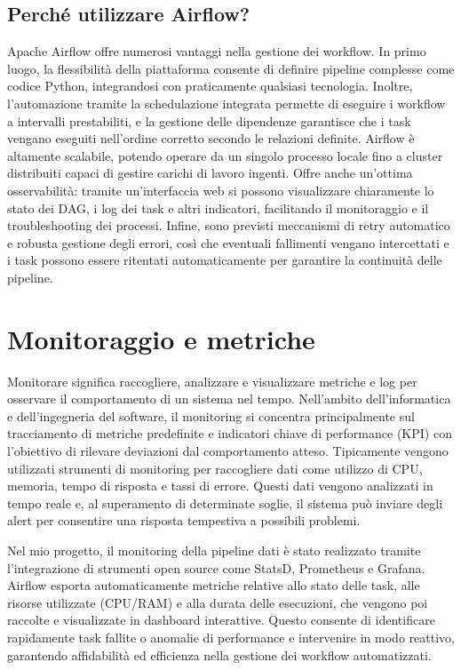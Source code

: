 \subsection{Perché utilizzare Airflow?}
\label{sec:percheairflow}
Apache Airflow offre numerosi vantaggi nella gestione dei workflow. In primo luogo, la flessibilità della piattaforma consente di definire pipeline complesse come codice Python, integrandosi con praticamente qualsiasi tecnologia. Inoltre, l’automazione tramite la schedulazione integrata permette di eseguire i workflow a intervalli prestabiliti, e la gestione delle dipendenze garantisce che i task vengano eseguiti nell’ordine corretto secondo le relazioni definite. Airflow è altamente scalabile, potendo operare da un singolo processo locale fino a cluster distribuiti capaci di gestire carichi di lavoro ingenti. Offre anche un’ottima osservabilità: tramite un’interfaccia web si possono visualizzare chiaramente lo stato dei DAG, i log dei task e altri indicatori, facilitando il monitoraggio e il troubleshooting dei processi. Infine, sono previsti meccanismi di retry automatico e robusta gestione degli errori, così che eventuali fallimenti vengano intercettati e i task possono essere ritentati automaticamente per garantire la continuità delle pipeline.

\section{Monitoraggio e metriche}
\label{sec:monitoraggioemetriche}

Monitorare significa raccogliere, analizzare e visualizzare metriche e log per osservare il comportamento di un sistema nel tempo. Nell’ambito dell’informatica e dell’ingegneria del software, il monitoring si concentra principalmente sul tracciamento di metriche predefinite e indicatori chiave di performance (KPI) con l’obiettivo di rilevare deviazioni dal comportamento atteso.
Tipicamente vengono utilizzati strumenti di monitoring per raccogliere dati come utilizzo di CPU, memoria, tempo di risposta e tassi di errore. Questi dati vengono analizzati in tempo reale e, al superamento di determinate soglie, il sistema può inviare degli alert per consentire una risposta tempestiva a possibili problemi.

Nel mio progetto, il monitoring della pipeline dati è stato realizzato tramite l’integrazione di strumenti open source come StatsD, Prometheus e Grafana. Airflow esporta automaticamente metriche relative allo stato delle task, alle risorse utilizzate (CPU/RAM) e alla durata delle esecuzioni, che vengono poi raccolte e visualizzate in dashboard interattive. Questo consente di identificare rapidamente task fallite o anomalie di performance e intervenire in modo reattivo, garantendo affidabilità ed efficienza nella gestione dei workflow automatizzati.

